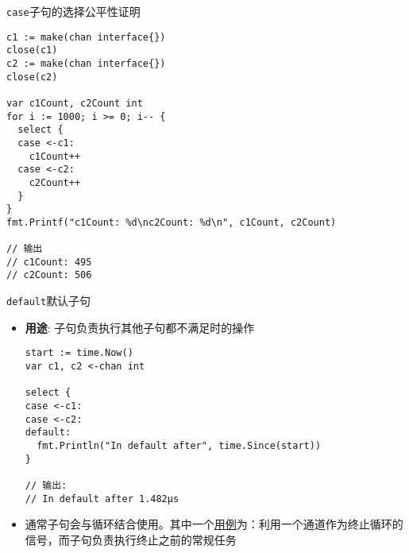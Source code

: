 \begin{frame}[fragile]{\texttt{case}子句的选择公平性证明}
\begin{lstlisting}
c1 := make(chan interface{})
close(c1)
c2 := make(chan interface{})
close(c2)

var c1Count, c2Count int
for i := 1000; i >= 0; i-- {
  select {
  case <-c1:
    c1Count++
  case <-c2:
    c2Count++
  }
}
fmt.Printf("c1Count: %d\nc2Count: %d\n", c1Count, c2Count)

// 输出
// c1Count: 495
// c2Count: 506
\end{lstlisting}    
\end{frame}

\begin{frame}[fragile]{\texttt{default}默认子句}
\begin{itemize}
    \item \textbf{用途}: 子句负责执行其他子句都不满足时的操作
\begin{lstlisting}
start := time.Now()
var c1, c2 <-chan int

select {
case <-c1:
case <-c2:
default:
  fmt.Println("In default after", time.Since(start))
}

// 输出:
// In default after 1.482µs
\end{lstlisting}
    \item 通常子句会与循环结合使用。其中一个\href{https://github.com/sammyne/concurrency-in-go/blob/master/chapter03/select/for_and_default.go}{用例}为：利用一个通道作为终止循环的信号，而子句负责执行终止之前的常规任务
\end{itemize}
\end{frame}